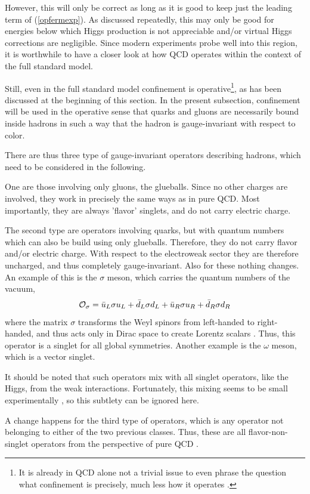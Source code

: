\documentclass[final,12pt,3p,longtitle]{elsarticle}
\newcommand*{\no}{\noindent}
\newcommand*{\be}{\begin{equation}}
\newcommand*{\ee}{\end{equation}}
\newcommand*{\pref}[1]{(\ref{#1})}
\newcommand*{\1}{1\!\!\!\bot}
\newcommand*{\op}{{\cal O}}
\begin{document}
However, this will only be correct as long as it is good to keep just the leading term of \pref{opfermexp}. As discussed repeatedly, this may only be good for energies below which Higgs production is not appreciable and/or virtual Higgs corrections are negligible. Since modern experiments probe well into this region, it is worthwhile to have a closer look at how QCD operates within the context of the full standard model.

Still, even in the full standard model confinement is operative\footnote{It is already in QCD alone not a trivial issue to even phrase the question what confinement is precisely, much less how it operates \cite{Greensite:2011zz,Greensite:2017ajx}.}, as has been discussed at the beginning of this section. In the present subsection, confinement will be used in the operative sense that quarks and gluons are necessarily bound inside hadrons in such a way that the hadron is gauge-invariant with respect to color.

There are thus three type of gauge-invariant operators describing hadrons, which need to be considered in the following.

One are those involving only gluons, the glueballs. Since no other charges are involved, they work in precisely the same ways as in pure QCD. Most importantly, they are always 'flavor' singlets, and do not carry electric charge.

The second type are operators involving quarks, but with quantum numbers which can also be build using only glueballs. Therefore, they do not carry flavor and/or electric charge. With respect to the electroweak sector they are therefore uncharged, and thus completely gauge-invariant. Also for these nothing changes. An example of this is the $\sigma$ meson, which carries the quantum numbers of the vacuum,
\be
\op_\sigma=\bar{u}_L\sigma u_L+\bar{d}_L\sigma d_L+\bar{u}_R\sigma u_R+\bar{d}_R\sigma d_R\label{sigma}
\ee
\no where the matrix $\sigma$ transforms the Weyl spinors from left-handed to right-handed, and thus acts only in Dirac space to create Lorentz scalars \cite{Aitchison:2007fn}. Thus, this operator is a singlet for all global symmetries. Another example is the $\omega$ meson, which is a vector singlet.

It should be noted that such operators mix with all singlet operators, like the Higgs, from the weak interactions. Fortunately, this mixing seems to be small experimentally \cite{pdg}, so this subtlety can be ignored here.

A change happens for the third type of operators, which is any operator not belonging to either of the two previous classes. Thus, these are all flavor-non-singlet operators from the perspective of pure QCD \cite{Egger:2017tkd}.
\end{document}

